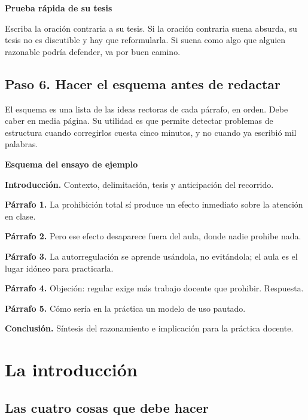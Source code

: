 \documentclass[12pt,a4paper,openany]{report}
\newenvironment{ejemplo}[1]
	{\begin{lrbox}{\cajaguardada}\begin{minipage}{\dimexpr\textwidth-2\fboxsep\relax}\vspace{4pt}\textcolor{verdeejemplo}{\textbf{\sffamily\small #1}}\par\vspace{3pt}\small}
	{\vspace{4pt}\end{minipage}\end{lrbox}\par\vspace{4pt}\noindent\colorbox{cremaejemplo}{\usebox{\cajaguardada}}\par\vspace{8pt}}
\newenvironment{aviso}[1]
	{\begin{lrbox}{\cajaguardada}\begin{minipage}{\dimexpr\textwidth-2\fboxsep\relax}\vspace{4pt}\textbf{\sffamily\small #1}\par\vspace{3pt}\small}
	{\vspace{4pt}\end{minipage}\end{lrbox}\par\vspace{4pt}\noindent\colorbox{grisclaro}{\usebox{\cajaguardada}}\par\vspace{8pt}}
\begin{document}
\begin{aviso}{Prueba r\'apida de su tesis}
Escriba la oraci\'on contraria a su tesis. Si la oraci\'on contraria suena absurda, su tesis no es discutible y hay que reformularla. Si suena como algo que alguien razonable podr\'ia defender, va por buen camino.
\end{aviso}

\section{Paso 6. Hacer el esquema antes de redactar}

El esquema es una lista de las ideas rectoras de cada p\'arrafo, en orden. Debe caber en media p\'agina. Su utilidad es que permite detectar problemas de estructura cuando corregirlos cuesta cinco minutos, y no cuando ya escribi\'o mil palabras.

\begin{ejemplo}{Esquema del ensayo de ejemplo}
\textbf{Introducci\'on.} Contexto, delimitaci\'on, tesis y anticipaci\'on del recorrido.

\textbf{P\'arrafo 1.} La prohibici\'on total s\'i produce un efecto inmediato sobre la atenci\'on en clase.

\textbf{P\'arrafo 2.} Pero ese efecto desaparece fuera del aula, donde nadie prohibe nada.

\textbf{P\'arrafo 3.} La autorregulaci\'on se aprende us\'andola, no evit\'andola; el aula es el lugar id\'oneo para practicarla.

\textbf{P\'arrafo 4.} Objeci\'on: regular exige m\'as trabajo docente que prohibir. Respuesta.

\textbf{P\'arrafo 5.} C\'omo ser\'ia en la pr\'actica un modelo de uso pautado.

\textbf{Conclusi\'on.} S\'intesis del razonamiento e implicaci\'on para la pr\'actica docente.
\end{ejemplo}

\chapter{La introducci\'on}

\section{Las cuatro cosas que debe hacer}
\end{document}
